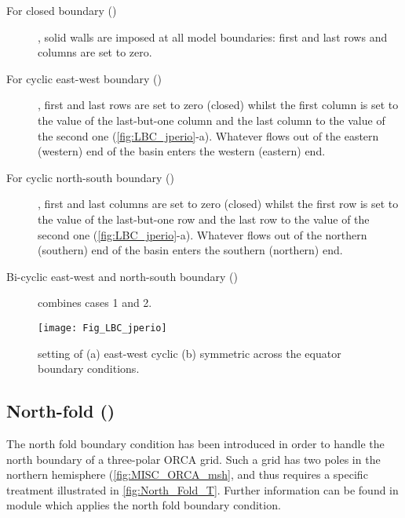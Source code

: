 \documentclass[../tex_main/NEMO_manual]{subfiles}
\begin{document}
\begin{description}

\item[For closed boundary ()], solid walls are imposed at all model 
boundaries: first and last rows and columns are set to zero.

\item[For cyclic east-west boundary ()], first and last rows are set 
to zero (closed) whilst the first column is set to the value of the last-but-one column 
and the last column to the value of the second one (\autoref{fig:LBC_jperio}-a). 
Whatever flows out of the eastern (western) end of the basin enters the western 
(eastern) end.

\item[For cyclic north-south boundary ()], first and last columns are set 
to zero (closed) whilst the first row is set to the value of the last-but-one row 
and the last row to the value of the second one (\autoref{fig:LBC_jperio}-a). 
Whatever flows out of the northern (southern) end of the basin enters the southern  
(northern) end.

\item[Bi-cyclic east-west and north-south boundary ()] combines cases 1 and 2.

\end{description}

\begin{figure}[!t]     \begin{center}
\texttt{[image: Fig\_LBC\_jperio]}
\caption{    \protect\label{fig:LBC_jperio}
setting of (a) east-west cyclic  (b) symmetric across the equator boundary conditions.}
\end{center}   \end{figure}

\subsection{North-fold (\protect{})}
\label{subsec:LBC_north_fold}

The north fold boundary condition has been introduced in order to handle the north 
boundary of a three-polar ORCA grid. Such a grid has two poles in the northern hemisphere 
(\autoref{fig:MISC_ORCA_msh}, and thus requires a specific treatment illustrated in \autoref{fig:North_Fold_T}. 
Further information can be found in  module which applies the north fold boundary condition.
\end{document}

